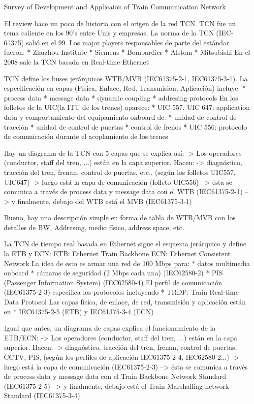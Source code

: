 \documentclass[
11pt, %
]{charter}
\begin{document}
Survey of Development and Applicaion of Train Communication Network

El review hace un poco de historia con el origen de la red TCN.
TCN fue un tema caliente en los 90's entre Unis y empresas.
La norma de la TCN (IEC-61375) salió en el 99.
Los major players responsables de parte del estándar fueron:
* Zhuzhou Institute
* Siemens
* Bombardier
* Alstom
* Mitsubishi
En el 2008  sale la TCN basada en Real-time Ethernet


TCN define los buses jerárquicos WTB/MVB (IEC61375-2-1, IEC61375-3-1).
La especificación en capas (Física, Enlace, Red, Transmision, Aplicación) incluye:
* process data
* message data
* dynamic coupling
* addresing protocols
En los folletos de la UIC(la ITU de los trenes) aparece:
* UIC 557, UIC 647: application data y comportamiento del equipamiento onboard de:
* unidad de control de tracción
* unidad de control de puertas
* control de frenos
* UIC 556: protocolo de comunicación durante el acoplamiento de los trenes

Hay un diagrama de la TCN con 5 capas que se explica así:
-> Los operadores (conductor, staff del tren, ...) están en la capa superior. Hacen:
-> diagnóstico, tracción del tren, frenan, control de puertas, etc., (según los folletos UIC557, UIC647)
-> luego está la capa de comunicación  (folleto UIC556)
--> ésta se comunica a través de process data y message data con el WTB (IEC61375-2-1)
--> y finalmente, debajo del WTB está el MVB (IEC61375-3-1)

Bueno, hay una descripción simple en forma de tabla de WTB/MVB con los detalles de
BW, Addresing, medio físico, address space, etc.


La TCN de tiempo real basada en Ethernet sigue el esquema jerárquico y define la ETB y ECN:
ETB: Ethernet Train Backbone
ECN: Ethernet Consistent Network
La idea de esto es armar una red de  100 Mbps para:
* datos multimedia onboard
* cámaras de seguridad (2 Mbps cada una) (IEC62580-2)
* PIS (Passenger Information System) (IEC62580-4)
El perfil de comunicación (IEC61375-2-3) especifica los protocolos incluyendo
* TRDP: Train Real-time Data Protocol
Las capas física, de enlace, de red, transmisión y aplicación están en
* IEC61375-2-5 (ETB) y IEC61375-3-4 (ECN)

Igual que antes, un diagrama de capas explica el funcionamiento de la ETB/ECN:
-> Los operadores (conductor, staff del tren, ...) están en la capa superior. Hacen:
-> diagnóstico, tracción del tren, frenan, control de puertas, CCTV, PIS,
(según los perfiles de aplicación IEC61375-2-4, IEC62580-2...)
-> luego está la capa de comunicación  (IEC61375-2-3)
--> ésta se comunica a través de process data y message data con el
Train  Backbone Network Standard (IEC61375-2-5)
--> y finalmente, debajo está el Train Marshalling network Standard (IEC61375-3-4)
\end{document}

